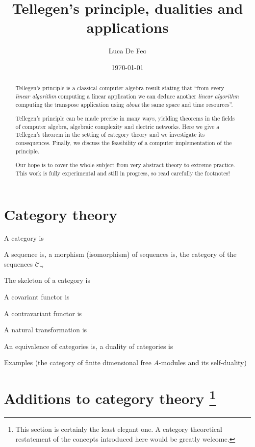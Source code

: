 \documentclass{article}
\newcommand{\cat}[1]{\mathscr{#1}}
\newcommand{\C}{\cat{C}}
\begin{document}
  \title{Tellegen's principle, dualities and applications}
  \author{Luca De Feo}
  \date{\today}
  
  \maketitle

  \begin{abstract}
    Tellegen's principle is a classical computer algebra result
    stating that ``from every \emph{linear algorithm} computing a
    linear application we can deduce another \emph{linear algorithm}
    computing the transpose application using \emph{about} the same
    space and time resources''.

    Tellegen's principle can be made precise in many ways, yielding
    theorems in the fields of computer algebra, algebraic complexity
    and electric networks. Here we give a Tellegen's theorem in the
    setting of category theory and we investigate its consequences.
    Finally, we discuss the feasibility of a computer implementation
    of the principle.

    Our hope is to cover the whole subject from very abstract theory
    to extreme practice. This work is fully experimental and still in
    progress, so read carefully the footnotes!
  \end{abstract}


  \section{Category theory}

  A category is

  A sequence is, a morphism (isomorphism) of sequences is, the
  category of the sequences $\C_\leadsto$
  
  The skeleton of a category is

  A covariant functor is
  
  A contravariant functor is

  A natural transformation is

  An equivalence of categories is, a duality of categories is

  Examples (the category of finite dimensional free $A$-modules and
  its self-duality)

  
  \section{Additions to category theory
    \protect\footnote{This section is certainly the least elegant
      one. A category theoretical restatement of the concepts
      introduced here would be greatly welcome.}}
\end{document}
